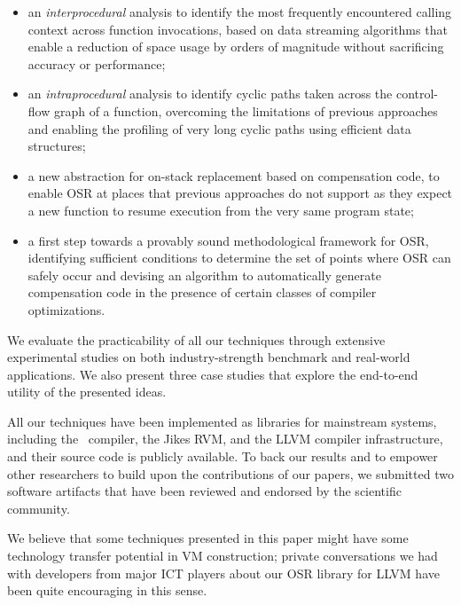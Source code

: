 \begin{itemize}
 \item an {\em interprocedural} analysis to identify the most frequently encountered calling context across function invocations, based on data streaming algorithms that enable a reduction of space usage by orders of magnitude without sacrificing accuracy or performance;
 \item an {\em intraprocedural} analysis to identify cyclic paths taken across the control-flow graph of a function, overcoming the limitations of previous approaches and enabling the profiling of very long cyclic paths using efficient data structures;
 \item a new abstraction for on-stack replacement based on compensation code, to enable OSR at places that previous approaches do not support as they expect a new function to resume execution from the very same program state;
 \item a first step towards a provably sound methodological framework for OSR, identifying sufficient conditions to determine the set of points where OSR can safely occur and devising an algorithm to automatically generate compensation code in the presence of certain classes of compiler optimizations.
\end{itemize}

\noindent We evaluate the practicability of all our techniques through extensive experimental studies on both industry-strength benchmark and real-world applications. We also present three case studies that explore the end-to-end utility of the presented ideas. 

All our techniques have been implemented as libraries for mainstream systems, including the \gcc\ compiler, the Jikes RVM, and the LLVM compiler infrastructure, and their source code is publicly available. To back our results and to empower other researchers to build upon the contributions of our papers, we submitted two software artifacts that have been reviewed and endorsed by the scientific community.

We believe that some techniques presented in this paper might have some technology transfer potential in VM construction; private conversations we had with developers from major ICT players about our OSR library for LLVM have been quite encouraging in this sense.


